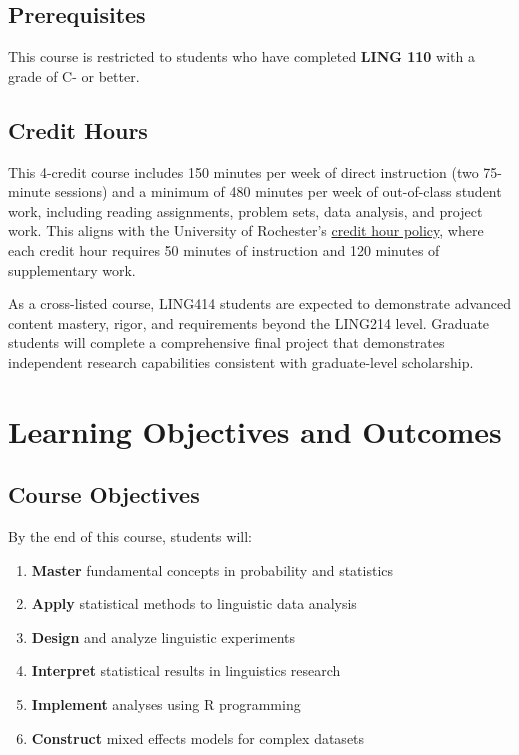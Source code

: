 \documentclass[11pt,letterpaper]{article}
\begin{document}
\subsection{Prerequisites}

This course is restricted to students who have completed \textbf{LING 110} with a grade of C- or better.

\subsection{Credit Hours}

This 4-credit course includes 150 minutes per week of direct instruction (two 75-minute sessions) and a minimum of 480 minutes per week of out-of-class student work, including reading assignments, problem sets, data analysis, and project work. This aligns with the University of Rochester's \href{https://www.rochester.edu/bulletin/policies/academic/credit-hour/}{credit hour policy}, where each credit hour requires 50 minutes of instruction and 120 minutes of supplementary work.

As a cross-listed course, LING414 students are expected to demonstrate advanced content mastery, rigor, and requirements beyond the LING214 level. Graduate students will complete a comprehensive final project that demonstrates independent research capabilities consistent with graduate-level scholarship.

\section{Learning Objectives and Outcomes}

\subsection{Course Objectives}

By the end of this course, students will:

\begin{enumerate}[leftmargin=*]
    \item \textbf{Master} fundamental concepts in probability and statistics
    \item \textbf{Apply} statistical methods to linguistic data analysis
    \item \textbf{Design} and analyze linguistic experiments
    \item \textbf{Interpret} statistical results in linguistics research
    \item \textbf{Implement} analyses using R programming
    \item \textbf{Construct} mixed effects models for complex datasets
\end{enumerate}
\end{document}
